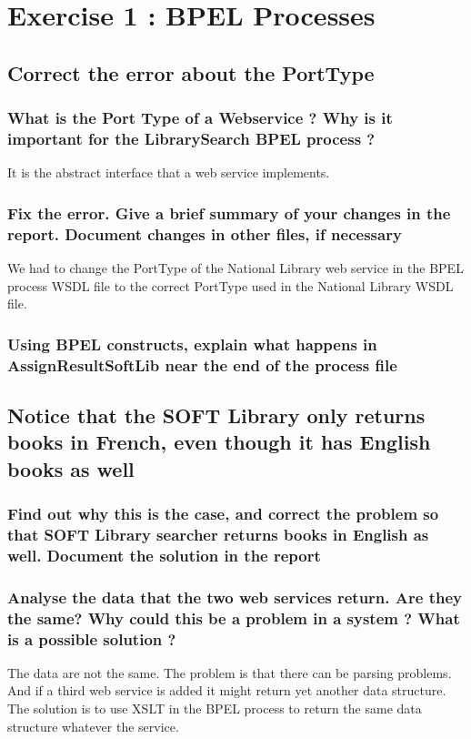 \section{Exercise 1 : BPEL Processes}

\subsection{Correct the error about the PortType}
    \subsubsection{What is the Port Type of a Webservice ? Why is it important for the LibrarySearch BPEL process ?}
    It is the abstract interface that a web service implements. 

    \subsubsection{Fix the error. Give a brief summary of your changes in the report. Document changes in other files, if necessary}

    We had to change the PortType of the National Library web service in the BPEL process WSDL file to the correct PortType used in the National Library WSDL file.

    \subsubsection{Using BPEL constructs, explain what happens in AssignResultSoftLib near the end of the process file}

\subsection{Notice that the SOFT Library only returns books in French, even though it has English books as well}

    \subsubsection{Find out why this is the case, and correct the problem so that SOFT Library searcher returns books in English as well. Document the solution in the
    report}

    \subsubsection{Analyse the data that the two web services return. Are they the same? Why could this be a problem in a system ? What is a possible solution ?}
    The data are not the same. The problem is that there can be parsing problems. And if a third web service is added it might return yet another data structure. The solution is to use XSLT in the BPEL process to return the same data structure whatever the service.

